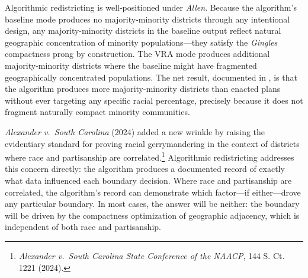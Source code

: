 Algorithmic redistricting is well-positioned under \textit{Allen}. Because the algorithm's baseline mode produces no majority-minority districts through any intentional design, any majority-minority districts in the baseline output reflect natural geographic concentration of minority populations---they satisfy the \textit{Gingles} compactness prong by construction. The VRA mode produces additional majority-minority districts where the baseline might have fragmented geographically concentrated populations. The net result, documented in \citet{dellaLibera2026vra}, is that the algorithm produces more majority-minority districts than enacted plans without ever targeting any specific racial percentage, precisely because it does not fragment naturally compact minority communities.

\textit{Alexander v.\ South Carolina} (2024) added a new wrinkle by raising the evidentiary standard for proving racial gerrymandering in the context of districts where race and partisanship are correlated.\footnote{\textit{Alexander v.\ South Carolina State Conference of the NAACP}, 144 S. Ct. 1221 (2024).} Algorithmic redistricting addresses this concern directly: the algorithm produces a documented record of exactly what data influenced each boundary decision. Where race and partisanship are correlated, the algorithm's record can demonstrate which factor---if either---drove any particular boundary. In most cases, the answer will be neither: the boundary will be driven by the compactness optimization of geographic adjacency, which is independent of both race and partisanship.
